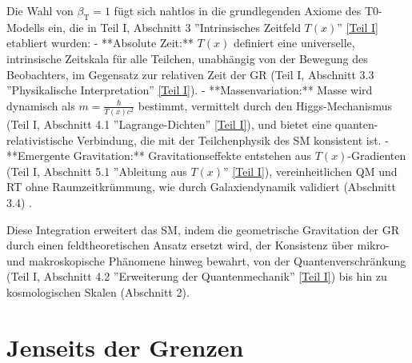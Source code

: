 \documentclass[12pt,a4paper]{article}
\newcommand{\Tfield}{T(x)}
\newcommand{\betaT}{\beta_{\text{T}}}
\begin{document}
	Die Wahl von \(\betaT = 1\) fügt sich nahtlos in die grundlegenden Axiome des T0-Modells ein, die in Teil I, Abschnitt 3 ''Intrinsisches Zeitfeld \(\Tfield\)'' \href{https://github.com/jpascher/T0-Time-Mass-Duality/tree/main/2/pdf/Deutsch/Bridging Quantum Mechanics and Relativity through Time-Mass Duality Part I Theoretical Foundations.pdf}{[Teil I]} etabliert wurden:
	- **Absolute Zeit:** \(\Tfield\) definiert eine universelle, intrinsische Zeitskala für alle Teilchen, unabhängig von der Bewegung des Beobachters, im Gegensatz zur relativen Zeit der GR (Teil I, Abschnitt 3.3 ''Physikalische Interpretation'' \href{https://github.com/jpascher/T0-Time-Mass-Duality/tree/main/2/pdf/Deutsch/Bridging Quantum Mechanics and Relativity through Time-Mass Duality Part I Theoretical Foundations.pdf}{[Teil I]}).
	- **Massenvariation:** Masse wird dynamisch als \(m = \frac{\hbar}{\Tfield c^2}\) bestimmt, vermittelt durch den Higgs-Mechanismus (Teil I, Abschnitt 4.1 ''Lagrange-Dichten'' \href{https://github.com/jpascher/T0-Time-Mass-Duality/tree/main/2/pdf/Deutsch/Bridging Quantum Mechanics and Relativity through Time-Mass Duality Part I Theoretical Foundations.pdf}{[Teil I]}), und bietet eine quanten-relativistische Verbindung, die mit der Teilchenphysik des SM konsistent ist.
	- **Emergente Gravitation:** Gravitationseffekte entstehen aus \(\Tfield\)-Gradienten (Teil I, Abschnitt 5.1 ''Ableitung aus \(\Tfield\)'' \href{https://github.com/jpascher/T0-Time-Mass-Duality/tree/main/2/pdf/Deutsch/Bridging Quantum Mechanics and Relativity through Time-Mass Duality Part I Theoretical Foundations.pdf}{[Teil I]}), vereinheitlichen QM und RT ohne Raumzeitkrümmung, wie durch Galaxiendynamik validiert (Abschnitt 3.4) \cite{pascher_lagrange_2025}.
	
	Diese Integration erweitert das SM, indem die geometrische Gravitation der GR durch einen feldtheoretischen Ansatz ersetzt wird, der Konsistenz über mikro- und makroskopische Phänomene hinweg bewahrt, von der Quantenverschränkung (Teil I, Abschnitt 4.2 ''Erweiterung der Quantenmechanik'' \href{https://github.com/jpascher/T0-Time-Mass-Duality/tree/main/2/pdf/Deutsch/Bridging Quantum Mechanics and Relativity through Time-Mass Duality Part I Theoretical Foundations.pdf}{[Teil I]}) bis hin zu kosmologischen Skalen (Abschnitt 2).
	
	\section{Jenseits der Grenzen}
	\label{sec:beyond_limits}
	
\end{document}
